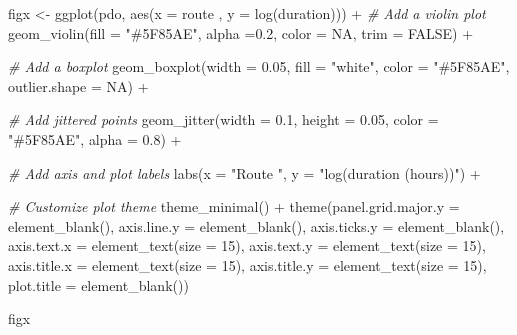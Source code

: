 \documentclass[
]{article}
\newenvironment{Shaded}{\begin{snugshade}}{\end{snugshade}}
\newcommand{\AttributeTok}[1]{\textcolor[rgb]{0.77,0.63,0.00}{#1}}
\newcommand{\CommentTok}[1]{\textcolor[rgb]{0.56,0.35,0.01}{\textit{#1}}}
\newcommand{\ConstantTok}[1]{\textcolor[rgb]{0.00,0.00,0.00}{#1}}
\newcommand{\DecValTok}[1]{\textcolor[rgb]{0.00,0.00,0.81}{#1}}
\newcommand{\FloatTok}[1]{\textcolor[rgb]{0.00,0.00,0.81}{#1}}
\newcommand{\FunctionTok}[1]{\textcolor[rgb]{0.00,0.00,0.00}{#1}}
\newcommand{\NormalTok}[1]{#1}
\newcommand{\OtherTok}[1]{\textcolor[rgb]{0.56,0.35,0.01}{#1}}
\newcommand{\SpecialCharTok}[1]{\textcolor[rgb]{0.00,0.00,0.00}{#1}}
\newcommand{\StringTok}[1]{\textcolor[rgb]{0.31,0.60,0.02}{#1}}
\begin{document}
\begin{Shaded}
\begin{Highlighting}[]
\NormalTok{figx }\OtherTok{\textless{}{-}} \FunctionTok{ggplot}\NormalTok{(pdo, }\FunctionTok{aes}\NormalTok{(}\AttributeTok{x =}\NormalTok{ route , }\AttributeTok{y =} \FunctionTok{log}\NormalTok{(duration))) }\SpecialCharTok{+} 
    \CommentTok{\# Add a violin plot }
  \FunctionTok{geom\_violin}\NormalTok{(}\AttributeTok{fill =} \StringTok{"\#5F85AE"}\NormalTok{, }\AttributeTok{alpha =}\FloatTok{0.2}\NormalTok{, }\AttributeTok{color =} \ConstantTok{NA}\NormalTok{, }\AttributeTok{trim =} \ConstantTok{FALSE}\NormalTok{) }\SpecialCharTok{+}

  \CommentTok{\# Add a boxplot }
  \FunctionTok{geom\_boxplot}\NormalTok{(}\AttributeTok{width =} \FloatTok{0.05}\NormalTok{, }\AttributeTok{fill =} \StringTok{"white"}\NormalTok{, }\AttributeTok{color =} \StringTok{"\#5F85AE"}\NormalTok{, }\AttributeTok{outlier.shape =} \ConstantTok{NA}\NormalTok{) }\SpecialCharTok{+}

  \CommentTok{\# Add jittered points }
  \FunctionTok{geom\_jitter}\NormalTok{(}\AttributeTok{width =} \FloatTok{0.1}\NormalTok{, }\AttributeTok{height =} \FloatTok{0.05}\NormalTok{, }\AttributeTok{color =} \StringTok{"\#5F85AE"}\NormalTok{, }\AttributeTok{alpha =} \FloatTok{0.8}\NormalTok{) }\SpecialCharTok{+}

  
  \CommentTok{\# Add axis and plot labels}
  \FunctionTok{labs}\NormalTok{(}\AttributeTok{x =} \StringTok{"Route "}\NormalTok{, }\AttributeTok{y =} \StringTok{"log(duration (hours))"}\NormalTok{) }\SpecialCharTok{+}
  
  \CommentTok{\# Customize plot theme}
  \FunctionTok{theme\_minimal}\NormalTok{() }\SpecialCharTok{+}
  \FunctionTok{theme}\NormalTok{(}\AttributeTok{panel.grid.major.y =} \FunctionTok{element\_blank}\NormalTok{(),}
    \AttributeTok{axis.line.y =} \FunctionTok{element\_blank}\NormalTok{(),}
    \AttributeTok{axis.ticks.y =} \FunctionTok{element\_blank}\NormalTok{(),}
    \AttributeTok{axis.text.x =} \FunctionTok{element\_text}\NormalTok{(}\AttributeTok{size =} \DecValTok{15}\NormalTok{),}
    \AttributeTok{axis.text.y =} \FunctionTok{element\_text}\NormalTok{(}\AttributeTok{size =} \DecValTok{15}\NormalTok{),}
    \AttributeTok{axis.title.x =} \FunctionTok{element\_text}\NormalTok{(}\AttributeTok{size =} \DecValTok{15}\NormalTok{),}
    \AttributeTok{axis.title.y =} \FunctionTok{element\_text}\NormalTok{(}\AttributeTok{size =} \DecValTok{15}\NormalTok{),}
    \AttributeTok{plot.title =} \FunctionTok{element\_blank}\NormalTok{())}

\NormalTok{figx}
\end{Highlighting}
\end{Shaded}
\end{document}
